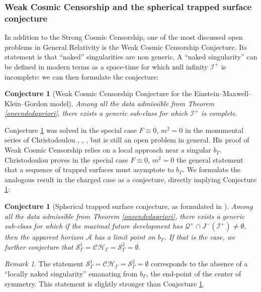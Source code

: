 \documentclass[10pt,a4paper]{article}
\theoremstyle{plain}
\newtheorem{conjecture}[thm]{Conjecture}
\theoremstyle{remark}
\newtheorem{rmk}{Remark}[section]
\newcommand{\A}{\mathcal{A}}
\theoremstyle{definition}
\theoremstyle{plain}
\theoremstyle{remark}
\theoremstyle{definition}
\numberwithin{equation}{section}
\begin{document}
\subsubsection{Weak Cosmic Censorship and the spherical trapped surface conjecture}

In addition to the Strong Cosmic Censorship, one of the most discussed open problems in General Relativity is the Weak Cosmic Censorship Conjecture. Its statement is that ``naked'' singularities are non generic. A ``naked singularity'' can be defined in modern terms as a space-time for which null infinity $\mathcal{I}^+$ is incomplete: we can then formulate the conjecture: \begin{conjecture}[Weak Cosmic Censorship Conjecture for the Einstein--Maxwell--Klein--Gordon model] \label{WCC}
	Among all the data admissible from Theorem \ref{oneendedapriori}, there exists a generic sub-class for which $\mathcal{I}^+$ is complete.
\end{conjecture} %
Conjecture \ref{WCC} was solved in the special case $F \equiv0$, $m^2=0$ in the monumental series of Christodoulou \cite{Christo1}, \cite{Christo2}, \cite{Christo3}, but is still an open problem in general. His proof of Weak Cosmic Censorship relies on a local approach near a singular $b_{\Gamma}$. Christodoulou proves in the special case $F \equiv0$, $m^2=0$ the general statement that a sequence of trapped surfaces must asymptote to $b_{\Gamma}$. We formulate the analogous result in the charged case as a conjecture, directly implying Conjecture \ref{WCC}: 
\begin{conjecture}[Spherical trapped surface conjecture, as formulated in \cite{Kommemi}] \label{trappedsurfaceconj}
	Among all the data admissible from Theorem \ref{oneendedapriori}, there exists a generic sub-class for which if the maximal future development has $\mathcal{Q}^+ \cap J^{-}(\mathcal{I}^+) \neq \emptyset$, then the apparent horizon $\A$ has a limit point on $b_{\Gamma}$. If that is the case, we further conjecture that $\mathcal{S}_{\Gamma}^{1}= \mathcal{CH}_{\Gamma} =\mathcal{S}_{\Gamma}^{2}=\emptyset$.\color{black}
\end{conjecture}\begin{rmk}
The statement $\mathcal{S}_{\Gamma}^{1}= \mathcal{CH}_{\Gamma} =\mathcal{S}_{\Gamma}^{2}=\emptyset$ corresponds to the absence of a ``locally naked singularity'' emanating from $b_{\Gamma}$, the end-point of the center of symmetry. This statement is slightly stronger than Conjecture \ref{WCC}.
\end{rmk}
\end{document}
